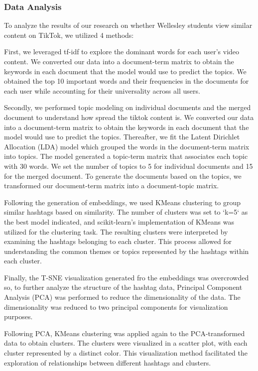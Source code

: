 \documentclass[acmtog]{acmart}
\begin{document}
\subsubsection{Data Analysis}
To analyze the results of our research on whether Wellesley students view similar content on TikTok, we utilized 4 methods:

First, we leveraged tf-idf to explore the dominant words for each user’s video content. We converted our data into a document-term matrix to obtain the keywords in each document that the model would use to predict the topics. We obtained the top 10 important words and their frequencies in the documents for each user while accounting for their universality across all users.

Secondly, we performed topic modeling on individual documents and the merged document to understand how spread the tiktok content is. We converted our data into a document-term matrix to obtain the keywords in each document that the model would use to predict the topics. Thereafter, we fit the Latent Dirichlet Allocation (LDA) model which grouped the words in the document-term matrix into topics. The model generated a topic-term matrix that associates each topic with 30 words. We set the number of topics to 5 for individual documents and 15 for the merged document. To generate the documents based on the topics, we transformed our document-term matrix into a document-topic matrix. 

Following the generation of embeddings, we used KMeans clustering to group similar hashtags based on similarity. The number of clusters was set to `k=5` as the best model indicated, and scikit-learn's implementation of KMeans was utilized for the clustering task. The resulting clusters were interpreted by examining the hashtags belonging to each cluster. This process allowed for understanding the common themes or topics represented by the hashtags within each cluster.

Finally, the T-SNE visualization generated fro the embeddings was overcrowded so, to further analyze the structure of the hashtag data, Principal Component Analysis (PCA) was performed to reduce the dimensionality of the data. The dimensionality was reduced to two principal components for visualization purposes.

Following PCA, KMeans clustering was applied again to the PCA-transformed data to obtain clusters. The clusters were visualized in a scatter plot, with each cluster represented by a distinct color. This visualization method facilitated the exploration of relationships between different hashtags and clusters.
\end{document}
